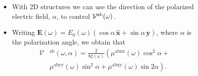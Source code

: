 \documentclass{beamer}
\begin{document}
\begin{frame}

{\small

\begin{columns}


\begin{itemize}

\item 
With 2D structures we can use the  direction of the polarized  electric field,
$\alpha$, to control ${\cal V}^{\mathrm{a}\mathrm{b}}(\omega)$.

\vspace{3mm}

\item 
Writing ${\mathbf E}(\omega) =
E_0(\omega)(\cos\alpha\,\hat{\mathbf x}+\sin\alpha\,\hat{\mathbf y})$, where
$\alpha$ is the polarization angle, we obtain that
\begin{align}
\mathcal{V}&^{\mathrm{ab}}(\omega,\alpha)
= 
\frac{2}{\hbar\xi(\omega)}
\left(\mu^{\mathrm{abxx}}(\omega)\cos^{2}\alpha + \right. \nonumber \\
&\left. \mu^{\mathrm{abyy}}(\omega)\sin^{2}\alpha + 
\mu^{\mathrm{abxy}}(\omega)\sin 2\alpha\right).
\label{eq:vab-aw}
\end{align}

\end{itemize}


\vspace{-4mm}

\begin{figure}[h!]
\end{figure}
\end{columns}}
\end{frame}
\end{document}
